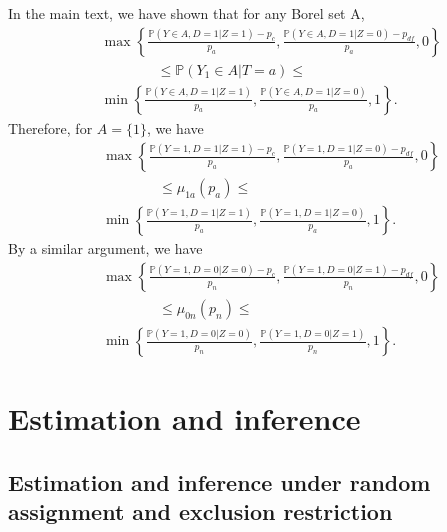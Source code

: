 \documentclass[12pt]{article}
\theoremstyle{plain}
\theoremstyle{definition}
\theoremstyle{remark}
\begin{document}

In the main text, we have shown that for any Borel set A, 
\begin{eqnarray*}
   && \max\left\{\frac{\mathbb P(Y\in A, D=1 \vert Z=1)- p_{c}}{p_a}, \frac{\mathbb P(Y\in A, D=1 \vert Z=0)- p_{df}}{p_a},0\right\}\\
   && \qquad \qquad \leq \mathbb P(Y_1 \in A \vert T=a) \leq \\
   && \min\left\{\frac{\mathbb P(Y\in A, D=1 \vert Z=1)}{p_a}, \frac{\mathbb P(Y\in A, D=1 \vert Z=0)}{p_a},1\right\}.   
   \end{eqnarray*}
   Therefore, for $A=\{1\}$, we have
   \begin{eqnarray*}
   && \max\left\{\frac{\mathbb P(Y=1, D=1 \vert Z=1)- p_{c}}{p_a}, \frac{\mathbb P(Y=1, D=1 \vert Z=0)- p_{df}}{p_a},0\right\}\\
   && \qquad \qquad \leq \mu_{1a}(p_a) \leq \\
   && \min\left\{\frac{\mathbb P(Y=1, D=1 \vert Z=1)}{p_a}, \frac{\mathbb P(Y=1, D=1 \vert Z=0)}{p_a},1\right\}.   
   \end{eqnarray*}
   By a similar argument, we have
\begin{eqnarray*}
   && \max\left\{\frac{\mathbb P(Y=1, D=0 \vert Z=0)- p_{c}}{p_n}, \frac{\mathbb P(Y=1, D=0 \vert Z=1)- p_{df}}{p_n},0\right\}\\
   && \qquad \qquad \leq \mu_{0n}(p_n) \leq \\
   && \min\left\{\frac{\mathbb P(Y=1, D=0 \vert Z=0)}{p_n}, \frac{\mathbb P(Y=1, D=0 \vert Z=1)}{p_n},1\right\}.   
   \end{eqnarray*}

\section{Estimation and inference} \label{esti_inf}

\subsection{Estimation and inference under random assignment and exclusion restriction}
\end{document}
